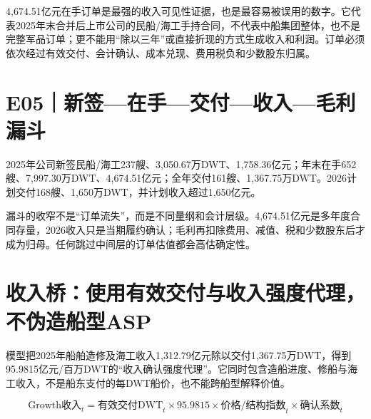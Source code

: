 4,674.51亿元在手订单是最强的收入可见性证据，也是最容易被误用的数字。它代表2025年末合并后上市公司的民船/海工手持合同，不代表中船集团整体，也不是完整军品订单；更不能用“除以三年”或直接折现的方式生成收入和利润。订单必须依次经过有效交付、会计确认、成本兑现、费用税负和少数股东归属。

\section{E05｜新签—在手—交付—收入—毛利漏斗}

2025年公司新签民船/海工237艘、3,050.67万DWT、1,758.36亿元；年末在手652艘、7,997.30万DWT、4,674.51亿元；全年交付161艘、1,367.75万DWT。2026计划交付168艘、1,650万DWT，并计划收入超过1,650亿元。

\begin{exhibitbox}[订单到盈利的证据漏斗]
\centering
{}
\end{exhibitbox}

漏斗的收窄不是“订单流失”，而是不同量纲和会计层级。4,674.51亿元是多年度合同存量，2026收入只是当期履约确认；毛利再扣除费用、减值、税和少数股东后才成为归母。任何跳过中间层的订单估值都会高估确定性。

\section{收入桥：使用有效交付与收入强度代理，不伪造船型ASP}

模型把2025年船舶造修及海工收入1,312.79亿元除以交付1,367.75万DWT，得到95.9815亿元/百万DWT的“收入确认强度代理”。它同时包含造船进度、修船与海工收入，不是船东支付的每DWT船价，也不能跨船型解释价值。

\begin{equation*}
\text{Growth收入}_{t}=\text{有效交付DWT}_{t}\times95.9815\times\text{价格/结构指数}_{t}\times\text{确认系数}_{t}
\end{equation*}

